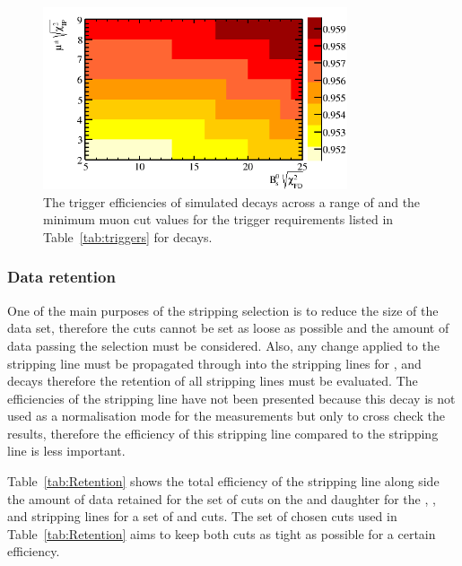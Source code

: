 \begin{figure}[htbp]
   \centering
        \includegraphics[width=0.8\textwidth]{./Figs/Selection/trigger_chart.png}
    \caption{The trigger efficiencies of \bsmumu simulated decays across a range of \bs \chiFD and the minimum muon \chiIP cut values for the trigger requirements listed in Table~\ref{tab:triggers} for \bmumu decays.}%
    \label{fig:triggereffplots}
\end{figure}



\subsubsection*{Data retention}

One of the main purposes of the stripping selection is to reduce the size of the data set, therefore the cuts cannot be set as loose as possible and the amount of data passing the selection must be considered. Also, any change applied to the \bmumu stripping line must be propagated through into the stripping lines for \bhh, \bujpsik and \bsjpsiphi decays therefore the retention of all stripping lines must be evaluated. The efficiencies of the \bsjpsiphi stripping line have not been presented because this decay is not used as a normalisation mode for the \BF measurements but only to cross check the results, therefore the efficiency of this stripping line compared to the \bmumu stripping line is less important.

Table~\ref{tab:Retention} shows the total efficiency of the \bsmumu stripping line along side the amount of data retained for the set of cuts on the \chiFD and daughter \chiIP for the \bmumu, \bhh, \bujpsik and \bsjpsiphi stripping lines for a set of \chiIP and \chiFD cuts. %
The set of chosen cuts used in Table~\ref{tab:Retention} aims to keep both cuts as tight as possible for a certain \bsmumu efficiency. 



